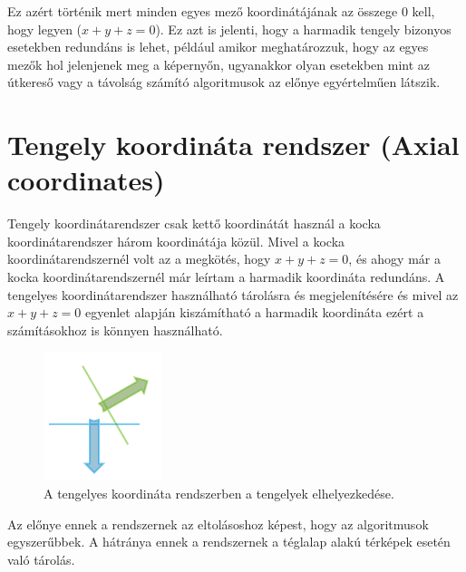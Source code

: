 \noindent Ez azért történik mert minden egyes mező koordinátájának az összege $0$ kell, hogy legyen ($x + y + z = 0$). Ez azt is jelenti, hogy a harmadik tengely bizonyos esetekben redundáns is lehet, például amikor meghatározzuk, hogy az egyes mezők hol jelenjenek meg a képernyőn, ugyanakkor olyan esetekben mint az útkereső vagy a távolság számító algoritmusok az előnye egyértelműen látszik. 

\section{Tengely koordináta rendszer (Axial coordinates)}

Tengely koordinátarendszer csak kettő koordinátát használ a kocka koordinátarendszer három koordinátája közül. Mivel a kocka koordinátarendszernél volt az a megkötés, hogy $x + y + z = 0$, és ahogy már a kocka koordinátarendszernél már leírtam a harmadik koordináta redundáns.  A tengelyes koordinátarendszer használható tárolásra és megjelenítésére és mivel az $x + y + z = 0$ egyenlet alapján kiszámítható a harmadik koordináta ezért a számításokhoz is könnyen használható.

\begin{figure}[h]
\centering
\includegraphics[scale=0.5]{kepek/img46.png}
\caption{A tengelyes koordináta rendszerben a tengelyek elhelyezkedése.}
\label{fig:img46}
\end{figure}

\noindent Az előnye ennek a rendszernek az eltolásoshoz képest, hogy az algoritmusok egyszerűbbek. A hátránya ennek a rendszernek a téglalap alakú térképek esetén való tárolás. 
